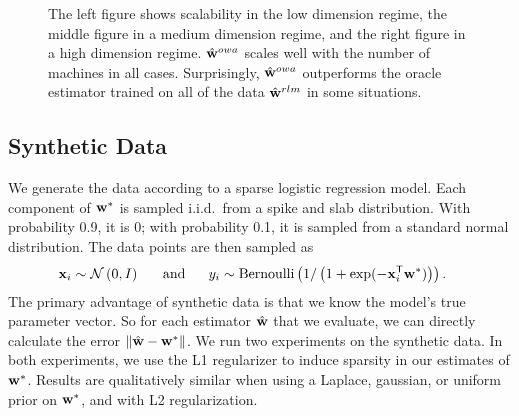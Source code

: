 \documentclass[thesis.tex]{subfiles}
\begin{document}
\begin{figure*}[t]
\caption{
    The left figure shows scalability in the low dimension regime,
    the middle figure in a medium dimension regime,
    and the right figure in a high dimension regime.
    $\hat{\mathbf w}^{owa}$ scales well with the number of machines in all cases.
    Surprisingly, $\hat{\mathbf w}^{owa}$ outperforms the oracle estimator trained on all of the data $\hat{\mathbf w}^{rlm}$ in some situations.
    \vspace{-0.1in}
    }
\label{fig:synscale}
\end{figure*}


\vspace{-0.1in}
\subsection{Synthetic Data}

\vspace{-0.05in}
We generate the data according to a sparse logistic regression model.
Each component of ${\mathbf w^{*}}$ is sampled i.i.d.\ from a spike and slab distribution.
With probability 0.9, it is 0;
with probability 0.1, it is sampled from a standard normal distribution.
The data points are then sampled as
\begin{equation}
\begin{aligned}
\mathbf{x}_i &\sim \mathcal{N}\left({{0}},{{I}}\right)
    \text{~~~~~and~~~~~}
y_i \sim \text{Bernoulli}\left(1/\left(1+\exp(-{\mathbf{x}}^{\mathsf{T}}_i{\mathbf w^{*}})\right)\right)
.
\end{aligned}
\end{equation}
The primary advantage of synthetic data is that we know the model's true parameter vector.
So for each estimator ${\hat{\mathbf w}}$ that we evaluate, we can directly calculate the error ${\lVert {{\hat{\mathbf w}}-{\mathbf w^{*}}} \rVert}$.
We run two experiments on the synthetic data.
In both experiments, we use the L1 regularizer to induce sparsity in our estimates of ${\mathbf w^{*}}$.
Results are qualitatively similar when using a Laplace, gaussian, or uniform prior on ${\mathbf w^{*}}$, and with L2 regularization.
\end{document}
